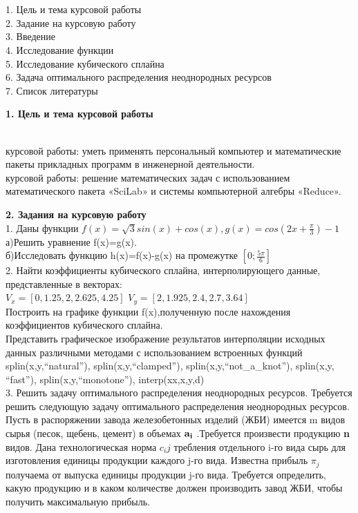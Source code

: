 ﻿ \documentclass[russian,utf8,nocolumnxxxi,nocolumnxxxii]{eskdtext}
\begin{document}
\\{}
\\1. Цель и тема курсовой работы
\\2. Задание на курсовую работу
\\3. Введение
\\4. Исследование функции
\\5. Исследование кубического сплайна
\\6. Задача оптимального распределения неоднородных ресурсов
\\7. Список литературы
\newpage

 {\large\bf 1. Цель и тема курсовой работы}

\\{ курсовой работы:} уметь применять персональный компьютер и математические пакеты прикладных программ в инженерной деятельности.
\\{ курсовой работы:} решение математических задач с использованием математического пакета «SciLab» и системы компьютерной алгебры «Reduce».

\newpage
{\large\bf2. Задания на курсовую работу}
\\1. Даны функции $f(x)=\sqrt{3}sin(x)+cos(x),g(x)=cos(2x+\frac{\pi}{3})-1$
\\а)Решить уравнение f(x)=g(x).
\\б)Исследовать функцию h(x)=f(x)-g(x) на промежутке $[0;\frac{5\pi}{6}]$
\\2. Найти коэффициенты кубического сплайна, интерполирующего данные, представленные в векторах:\\
$V_{x}=[0,1.25,2,2.625,4.25]$
$V_{y}=[2,1.925,2.4,2.7,3.64]$\\
Построить на графике функции f(x),полученную после нахождения коэффициентов кубического сплайна. \\
Представить графическое изображение результатов интерполяции исходных данных различными методами с использованием встроенных функций splin(x,y,“natural”), splin(x,y,“clamped”), splin(x,y,“not\_a\_knot”), splin(x,y, “fast”), splin(x,y,“monotone”), interp(xx,x,y,d)\\
3. Решить задачу оптимального распределения неоднородных ресурсов.
Требуется решить следующую задачу оптимального распределения неоднородных ресурсов. Пусть в распоряжении завода железобетонных изделий (ЖБИ) имеется m видов сырья (песок, щебень, цемент) в объемах ${\bf a_i}$  .Требуется произвести продукцию {\bf n} видов. Дана технологическая норма $c_ij$  требления отдельного i-го вида сырь для изготовления единицы продукции каждого j-го вида. Известна прибыль $\pi_j$  получаема от выпуска единицы продукции j-го вида. Требуется определить, какую продукцию и в каком количестве должен производить завод ЖБИ, чтобы получить максимальную прибыль.
\end{document}
